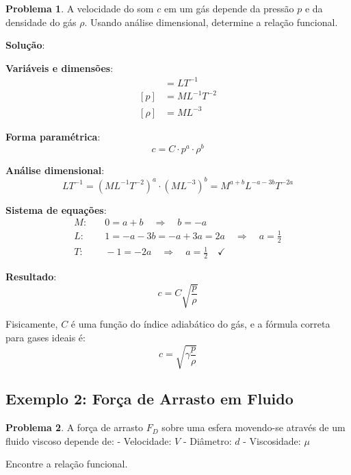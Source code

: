 \documentclass[12pt,a4paper,oneside]{book}
\theoremstyle{definition}
\newtheorem{problem}{Problema}
\begin{document}
\begin{problem}
A velocidade do som $c$ em um gás depende da pressão $p$ e da densidade do gás $\rho$. Usando análise dimensional, determine a relação funcional.
\end{problem}

\textbf{Solução}:

\textbf{Variáveis e dimensões}:
\begin{align}
    [c] &= LT^{-1} \\
    [p] &= ML^{-1}T^{-2} \\
    [\rho] &= ML^{-3}
\end{align}

\textbf{Forma paramétrica}:
\begin{equation}
    c = C \cdot p^a \cdot \rho^b
\end{equation}

\textbf{Análise dimensional}:
\begin{equation}
    LT^{-1} = (ML^{-1}T^{-2})^a \cdot (ML^{-3})^b = M^{a+b} L^{-a-3b} T^{-2a}
\end{equation}

\textbf{Sistema de equações}:
\begin{align}
    M: & \quad 0 = a + b \quad \Rightarrow \quad b = -a \\
    L: & \quad 1 = -a - 3b = -a + 3a = 2a \quad \Rightarrow \quad a = \frac{1}{2} \\
    T: & \quad -1 = -2a \quad \Rightarrow \quad a = \frac{1}{2} \quad \checkmark
\end{align}

\textbf{Resultado}:
\begin{equation}
    c = C\sqrt{\frac{p}{\rho}}
\end{equation}

Fisicamente, $C$ é uma função do índice adiabático do gás, e a fórmula correta para gases ideais é:
\begin{equation}
    c = \sqrt{\gamma \frac{p}{\rho}}
\end{equation}

\subsection{Exemplo 2: Força de Arrasto em Fluido}

\begin{problem}
A força de arrasto $F_D$ sobre uma esfera movendo-se através de um fluido viscoso depende de:
- Velocidade: $V$
- Diâmetro: $d$
- Viscosidade: $\mu$

Encontre a relação funcional.
\end{problem}
\end{document}
